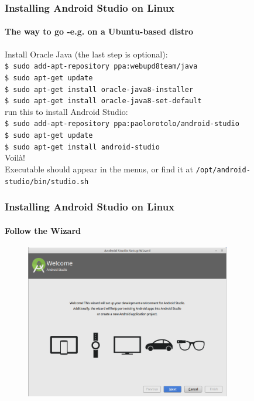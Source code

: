 \documentclass{beamer}
\begin{document}
	\begin{frame}
	\frametitle{Installing Android Studio on Linux}
	\framesubtitle{The way to go -e.g. on a Ubuntu-based distro}
	Install Oracle Java (the last step is optional):\\
	\texttt{\$ sudo add-apt-repository ppa:webupd8team/java\\
	\$ sudo apt-get update\\
	\$ sudo apt-get install oracle-java8-installer\\
	\$ sudo apt-get install oracle-java8-set-default\\
	}
	\vspace{1em}
	run  this to install Android Studio:\\
	\texttt{\$ sudo add-apt-repository ppa:paolorotolo/android-studio\\
	\$ sudo apt-get update\\
	\$ sudo apt-get install android-studio\\
	}
	\vspace{1em}
	Voilà!\\
	Executable should appear in the menus, or find it at \texttt{/opt/android-studio/bin/studio.sh}
	\end{frame}

	\begin{frame}
	\frametitle{Installing Android Studio on Linux}
	\framesubtitle{Follow the Wizard}
	        \begin{figure}[h]
                \centering
                \includegraphics[width=0.8\textwidth]{./images/android-studio-wizard1}
        	\end{figure}
	\end{frame}
\end{document}
